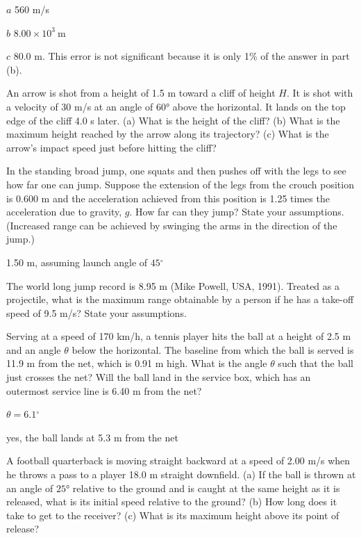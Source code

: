 \documentclass[
]{book}
\newenvironment{problems-exercises}{}{}
\begin{document}
\begin{problems-exercises}
\leavevmode\hypertarget{fs-id2075683}{}%
\(a\) 560 m/s

\(b\) \({8\text{.}{\text{00} \times \text{10}^{3}}\ \text{m}}{}\)

\(c\) 80.0 m. This error is not significant because it is only 1\% of the
answer in part (b).

\hypertarget{fs-id1925728}{}
\leavevmode\hypertarget{fs-id2282381}{}%
An arrow is shot from a height of 1.5 m toward a cliff of height \(H{}\).
It is shot with a velocity of 30 m/s at an angle of \(\text{60°}{}\) above
the horizontal. It lands on the top edge of the cliff 4.0 s later. (a)
What is the height of the cliff? (b) What is the maximum height reached
by the arrow along its trajectory? (c) What is the arrow's impact speed
just before hitting the cliff?

\hypertarget{fs-id1745072}{}
\leavevmode\hypertarget{fs-id2275266}{}%
In the standing broad jump, one squats and then pushes off with the legs
to see how far one can jump. Suppose the extension of the legs from the
crouch position is 0.600 m and the acceleration achieved from this
position is 1.25 times the acceleration due to gravity, \(g{}\). How far
can they jump? State your assumptions. (Increased range can be achieved
by swinging the arms in the direction of the jump.)

\leavevmode\hypertarget{fs-id2864553}{}%
1.50 m, assuming launch angle of \(45{^\circ}\)

\hypertarget{fs-id1875777}{}
\leavevmode\hypertarget{fs-id2864558}{}%
The world long jump record is 8.95 m (Mike Powell, USA, 1991). Treated
as a projectile, what is the maximum range obtainable by a person if he
has a take-off speed of 9.5 m/s? State your assumptions.

\hypertarget{fs-id2254986}{}
\leavevmode\hypertarget{fs-id1543443}{}%
Serving at a speed of 170 km/h, a tennis player hits the ball at a
height of 2.5 m and an angle \(\theta{}\) below the horizontal. The
baseline from which the ball is served is 11.9 m from the net, which is
0.91 m high. What is the angle \(\theta{}\) such that the ball just
crosses the net? Will the ball land in the service box, which has an
outermost service line is 6.40 m from the net?

\leavevmode\hypertarget{fs-id722706}{}%
\({\theta = 6.1{^\circ}}{}\)

yes, the ball lands at 5.3 m from the net

\hypertarget{fs-id2173828}{}
\leavevmode\hypertarget{fs-id2088349}{}%
A football quarterback is moving straight backward at a speed of 2.00
m/s when he throws a pass to a player 18.0 m straight downfield. (a) If
the ball is thrown at an angle of \(\text{25°}{}\) relative to the ground
and is caught at the same height as it is released, what is its initial
speed relative to the ground? (b) How long does it take to get to the
receiver? (c) What is its maximum height above its point of release?


\end{problems-exercises}
\end{document}
